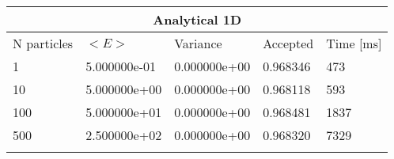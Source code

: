 \begin{tabular}{|l|l|l|l|l|}
\hline 
\multicolumn{5}{|c|}{Analytical 1D}\\ 
\hline 
N particles & $<E>$ & Variance & Accepted & Time [ms]\\ 
 \hline 
1 & 5.000000e-01 & 0.000000e+00 & 0.968346 & 473 \\ \hline 
10 & 5.000000e+00 & 0.000000e+00 & 0.968118 & 593 \\ \hline 
100 & 5.000000e+01 & 0.000000e+00 & 0.968481 & 1837 \\ \hline 
500 & 2.500000e+02 & 0.000000e+00 & 0.968320 & 7329 \\ \hline 
\label{h:a1} 
\end{tabular}